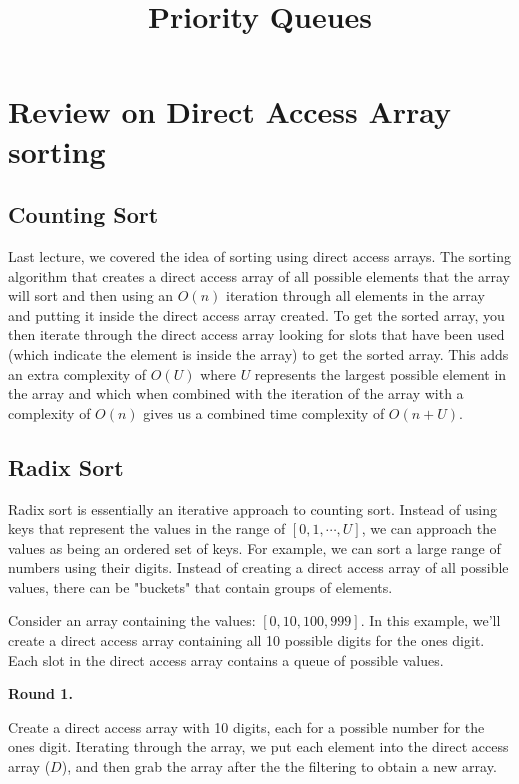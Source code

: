 \documentclass[11pt,a4paper,english]{article}
\begin{document}
\title{Priority Queues}
\maketitle

\tableofcontents

\section{Review on Direct Access Array sorting}

\subsection{Counting Sort}
Last lecture, we covered the idea of sorting using direct access arrays. The sorting algorithm that creates a direct access array of all possible elements that the array will sort and then using an $O(n)$ iteration through all elements in the array and putting it inside the direct access array created. To get the sorted array, you then iterate through the direct access array looking for slots that have been used (which indicate the element is inside the array) to get the sorted array. This adds an extra complexity of $O(U)$ where $U$ represents the largest possible element in the array and which when combined with the iteration of the array with a complexity of $O(n)$ gives us a combined time complexity of $O(n + U)$.

\subsection{Radix Sort}

Radix sort is essentially an iterative approach to counting sort. Instead of using keys that represent the values in the range of $[0, 1, \dotsb, U]$, we can approach the values as being an ordered set of keys. For example, we can sort a large range of numbers using their digits. Instead of creating a direct access array of all possible values, there can be "buckets" that contain groups of elements.


\bigskip
\noindent Consider an array containing the values: $[0, 10, 100, 999]$. In this example, we'll create a direct access array containing all 10 possible digits for the ones digit. Each slot in the direct access array contains a queue of possible values. 

\bigskip \noindent \textbf{Round 1.} 

\noindent Create a direct access array with 10 digits, each for a possible number for the ones digit. Iterating through the array, we put each element into the direct access array ($D$), and then grab the array after the the filtering to obtain a new array.
\end{document}
